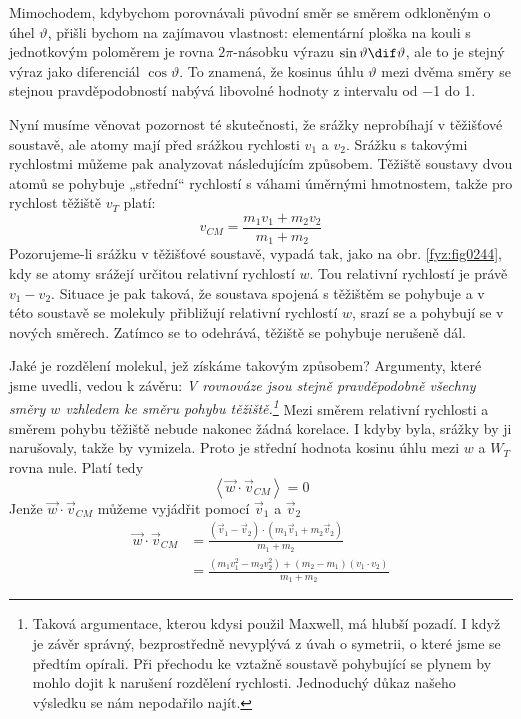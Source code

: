     Mimochodem, kdybychom porovnávali původní směr se směrem odkloněným o úhel \(\vartheta\), přišli
    bychom na zajímavou vlastnost: elementární ploška na kouli s jednotkovým poloměrem je rovna
    \(2\pi\)-násobku výrazu \(\sin\vartheta\dif\vartheta\), ale to je stejný výraz jako diferenciál
    \(\cos\vartheta\). To znamená, že kosinus úhlu \(\vartheta\) mezi dvěma směry se stejnou
    pravděpodobností nabývá libovolné hodnoty z intervalu od \num{-1} do \num{+1}.

    Nyní musíme věnovat pozornost té skutečnosti, že srážky neprobíhají v těžišťové soustavě, ale
    atomy mají před srážkou rychlosti \(v_1\) a \(v_2\). Srážku s takovými rychlostmi můžeme pak
    analyzovat následujícím způsobem. Těžiště soustavy dvou atomů se pohybuje „střední“ rychlostí s
    váhami úměrnými hmotnostem, takže pro rychlost těžiště \(v_T\) platí: 
    \begin{equation*}
      v_{CM} = \frac{m_1v_1 + m_2v_2}{m_1 + m_2}
    \end{equation*}
    Pozorujeme-li srážku v těžišťové soustavě, vypadá tak, jako na obr. \ref{fyz:fig0244}, kdy se
    atomy srážejí určitou relativní rychlostí \(w\). Tou relativní rychlostí je právě \(v_1-v_2\).
    Situace je pak taková, že soustava spojená s těžištěm se pohybuje a v této soustavě se molekuly
    přibližují relativní rychlostí \(w\), srazí se a pohybují se v nových směrech. Zatímco se to
    odehrává, těžiště se pohybuje nerušeně dál.

    Jaké je rozdělení molekul, jež získáme takovým způsobem? Argumenty, které jsme uvedli, vedou k
    závěru: \emph{V rovnováze jsou stejně pravděpodobně všechny směry \(w\) vzhledem ke směru pohybu
    těžiště.\footnote{Taková argumentace, kterou kdysi použil Maxwell, má hlubší pozadí. I když je
    závěr správný, bezprostředně nevyplývá z úvah o symetrii, o které jsme se předtím opírali. Při
    přechodu ke vztažně soustavě pohybující se plynem by mohlo dojit k narušení rozdělení rychlosti.
    Jednoduchý důkaz našeho výsledku se nám nepodařilo najít.}} Mezi směrem relativní rychlosti a
    směrem pohybu těžiště nebude nakonec žádná korelace. I kdyby byla, srážky by ji narušovaly,
    takže by vymizela. Proto je střední hodnota kosinu úhlu mezi \(w\) a \(W_T\) rovna nule. Platí
    tedy
    \begin{equation}\label{fyz:eq629}
      \left\langle\vec{w}\cdot\vec{v}_{CM}\right\rangle = 0
    \end{equation}
    Jenže \(\vec{w}\cdot\vec{v}_{CM}\) můžeme vyjádřit pomocí \(\vec{v}_1\) a \(\vec{v}_2\)
    \begin{align}
      \vec{w}\cdot\vec{v}_{CM} 
        &= \frac{(\vec{v}_1−\vec{v}_2)\cdot(m_1\vec{v}_1+m_2\vec{v}_2)}{m_1+m_2} \nonumber \\
        &= \frac{(m_1v^2_1−m_2v^2_2)+(m_2−m_1)(v_1\cdot v_2)}{m_1+m_2} \label{fyz:eq630}
    \end{align}

